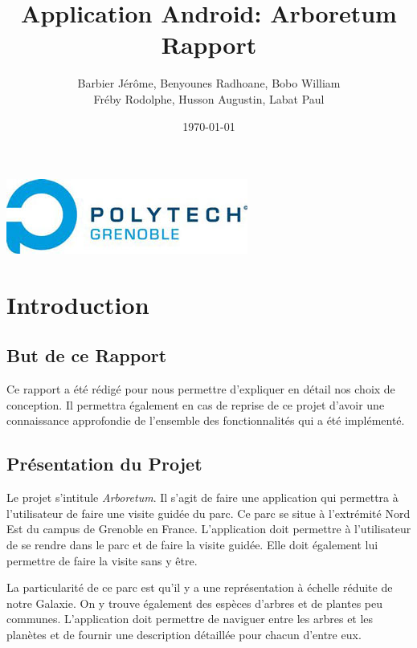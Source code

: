 \documentclass[a4paper,11pt]{article}
\title{Application Android: Arboretum\\
Rapport}
\author{Barbier Jérôme, Benyounes Radhoane, Bobo William\\ Fréby Rodolphe, Husson Augustin, Labat Paul}
\date{\today}
\begin{document}
   \maketitle

  \begin{center}
    \includegraphics{logoPol.jpg}\\
  \end{center}
  \tableofcontents
  \newpage
  
  \section{Introduction}
    \subsection{But de ce Rapport}
  Ce rapport a été rédigé pour nous permettre d'expliquer en détail nos choix de conception. Il permettra également en cas de reprise de ce projet 
  d'avoir une connaissance approfondie de l'ensemble des fonctionnalités qui a été implémenté.
  
    \subsection{Présentation du Projet}
    Le projet s'intitule \textit{Arboretum}. Il s'agit de faire une application qui permettra à l'utilisateur de faire une visite guidée du parc.
    Ce parc se situe à l'extrémité Nord Est du campus de Grenoble en France. L'application doit permettre à l'utilisateur de se rendre dans le parc
    et de faire la visite guidée. Elle doit également lui permettre de faire la visite sans y être. 
    
    La particularité de ce parc est qu'il y a une représentation à échelle réduite de notre Galaxie. On y trouve également des espèces d'arbres et de plantes
    peu communes. L'application doit permettre de naviguer entre les arbres et les planètes et de fournir une description détaillée pour chacun d'entre eux.
\end{document}
